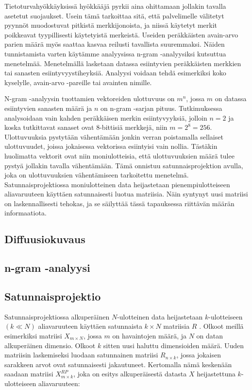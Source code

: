 Tietoturvahyökkäyksissä hyökkääjä pyrkii aina ohittamaan jollakin tavalla asetetut suojaukset. Usein tämä tarkoittaa sitä, että palvelimelle välitetyt pyynnöt muodostuvat pitkistä merkkijonoista, ja niissä käytetyt
merkit poikkeavat tyypillisesti käytetyistä merkeistä. Useiden peräkkäisten avain-arvo parien määrä myös saattaa kasvaa reilusti tavallista suuremmaksi. Näiden tunnistamista varten käytämme analyysissa n-gram -analyysiksi
kutsuttua menetelmää. Menetelmällä lasketaan datassa esiintyvien peräkkäisten merkkien tai sanasten esiintyvyystiheyksiä. Analyysi voidaan tehdä esimerkiksi koko kyselylle, avain-arvo -pareille tai avainten nimille. 

N-gram -analyysin tuottamien vektoreiden ulottuvuus on $m^n$, jossa $m$ on datassa esiintyvien sanasten määrä ja $n$ on n-gram -sarjan pituus. Tutkimuksessa analysoidaan vain kahden peräkkäisen merkin esiintyvyyksiä, jolloin $n=2$ ja koska tutkittavat sanaset ovat 8-bittisiä merkkejä, niin $m=2^8=256$. Ulottuvuuksia pystytään vähentämään jonkin verran poistamalla sellaiset ulottuvuudet, joissa jokaisessa vektorissa esiintyisi vain nollia. Tästäkin huolimatta vektorit ovat niin moniulotteisia, että ulottuvuuksien määrä tulee pystyä jollakin tavalla vähentämään. Tämä onnistuu satunnaisprojektion avulla, joka on ulottuvuuksien
vähentämiseen tarkoitettu menetelmä. Satunnaisprojektiossa moniulotteinen data heijastetaan pienempiulotteiseen aliavaruuteen käyttäen satunnaisesti luotua matriisia. Näin syntynyt uusi matriisi on laskennallisesti
tehokas, ja se säilyttää tässä tapauksessa riittävän määrän informaatiota.

\subsection{Diffuusiokuvaus}

\subsection{n-gram -analyysi}



\subsection{Satunnaisprojektio}

Satunnaisprojektiossa alkuperäinen $N$-ulotteinen data heijastetaan $k$-ulotteiseen $(k \ll N)$ aliavaruuteen käyttäen satunnaista $k \times N$ matriisia $R$ \cite{Random}. Olkoot meillä esimerkiksi matriisi 
$X_{m\times N}$, jossa $m$ on havaintojen määrä, ja $N$ on datan alkuperäinen dimensio. Olkoot  $k$  sitten uusi haluttu dimensioiden määrä. Uuden matriisin laskemiseksi luodaan satunnainen matriisi 
$R_{n \times k}$, jossa jokaisen sarakkeen arvot ovat satunnaisesti jakautuneet. Kertomalla nämä keskenään saadaan matriisi $X_{m \times k}^{RP}$, joka on esitys alkuperäisestä datasta $X$ heijastettuna $k$-ulotteiseen 
aliavaruuteen:


